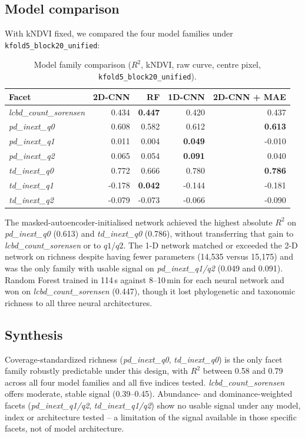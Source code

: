 \documentclass[11pt]{article}
\begin{document}
\subsection{Model comparison}

With kNDVI fixed, we compared the four model families under
\texttt{kfold5\_block20\_unified}:

\begin{table}[h]
\centering
\begin{tabular}{lrrrr}
\toprule
Facet & 2D-CNN & RF & 1D-CNN & 2D-CNN + MAE \\
\midrule
\emph{lcbd\_count\_sorensen} & 0.434 & \textbf{0.447} & 0.420 & 0.437 \\
\emph{pd\_inext\_q0}         & 0.608 & 0.582 & 0.612 & \textbf{0.613} \\
\emph{pd\_inext\_q1}         & 0.011 & 0.004 & \textbf{0.049} & -0.010 \\
\emph{pd\_inext\_q2}         & 0.065 & 0.054 & \textbf{0.091} & 0.040 \\
\emph{td\_inext\_q0}         & 0.772 & 0.666 & 0.780 & \textbf{0.786} \\
\emph{td\_inext\_q1}         & -0.178 & \textbf{0.042} & -0.144 & -0.181 \\
\emph{td\_inext\_q2}         & -0.079 & -0.073 & -0.066 & -0.090 \\
\bottomrule
\end{tabular}
\caption{Model family comparison ($R^2$, kNDVI, raw curve, centre pixel,
\texttt{kfold5\_block20\_unified}).}
\end{table}

The masked-autoencoder-initialised network achieved the highest absolute $R^2$ on
\emph{pd\_inext\_q0} (0.613) and \emph{td\_inext\_q0} (0.786), without transferring that
gain to \emph{lcbd\_count\_sorensen} or to $q1$/$q2$. The 1-D network matched or exceeded
the 2-D network on richness despite having fewer parameters (14{,}535 versus 15{,}175)
and was the only family with usable signal on \emph{pd\_inext\_q1/q2} (0.049 and 0.091).
Random Forest trained in 114\,s against 8--10\,min for each neural network and won on
\emph{lcbd\_count\_sorensen} (0.447), though it lost phylogenetic and taxonomic richness
to all three neural architectures.

\subsection{Synthesis}

Coverage-standardized richness (\emph{pd\_inext\_q0}, \emph{td\_inext\_q0}) is the only
facet family robustly predictable under this design, with $R^2$ between 0.58 and 0.79
across all four model families and all five indices tested. \emph{lcbd\_count\_sorensen}
offers moderate, stable signal (0.39--0.45). Abundance- and dominance-weighted facets
(\emph{pd\_inext\_q1/q2}, \emph{td\_inext\_q1/q2}) show no usable signal under any model,
index or architecture tested -- a limitation of the signal available in those specific
facets, not of model architecture.


\end{document}
